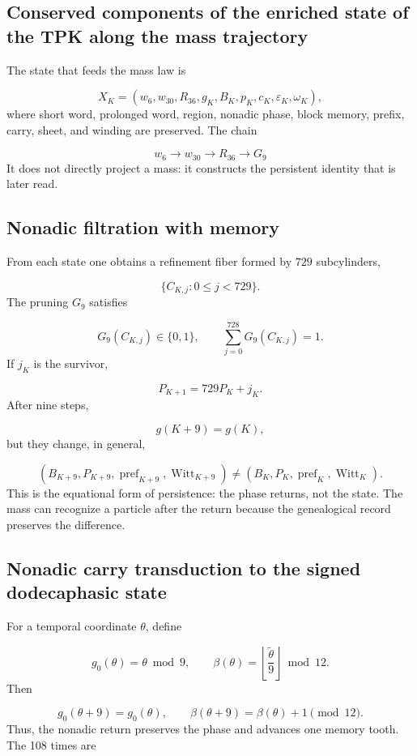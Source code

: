 \subsection{Conserved components of the enriched state of the TPK along the mass trajectory}
The state that feeds the mass law is

\[
 X_K=(w_6,w_{30},R_{36},g_K,B_K,p_K,c_K,\varepsilon_K,\omega_K),
\]
where short word, prolonged word, region, nonadic phase, block memory, prefix, carry, sheet, and winding are preserved. The chain

\[
 w_6\longrightarrow w_{30}\longrightarrow R_{36}
 \longrightarrow G_9
\]
It does not directly project a mass: it constructs the persistent identity that is later read.

\subsection{Nonadic filtration with memory}
From each state one obtains a refinement fiber formed by \(729\) subcylinders,

\[
 \{C_{K,j}:0\le j<729\}.
\]
The pruning \(G_9\) satisfies

\[
 G_9(C_{K,j})\in\{0,1\},\qquad
 \sum_{j=0}^{728}G_9(C_{K,j})=1.
\]
If \(j_K\) is the survivor,

\[
 P_{K+1}=729P_K+j_K.
\]
After nine steps,

\[
 g(K+9)=g(K),
\]
but they change, in general,

\[
 (B_{K+9},P_{K+9},\operatorname{pref}_{K+9},
 \operatorname{Witt}_{K+9})
 \ne
 (B_K,P_K,\operatorname{pref}_K,\operatorname{Witt}_K).
\]
This is the equational form of persistence: the phase returns, not the state. The mass can recognize a particle after the return because the genealogical record preserves the difference.

\subsection{Nonadic carry transduction to the signed dodecaphasic state}
For a temporal coordinate \(\theta\), define

\[
 g_0(\theta)=\theta\bmod9,\qquad
 \beta(\theta)=
 \left\lfloor\frac{\widetilde\theta}{9}\right\rfloor\bmod12.
\]
Then

\[
 g_0(\theta+9)=g_0(\theta),\qquad
 \beta(\theta+9)=\beta(\theta)+1\pmod{12}.
\]
Thus, the nonadic return preserves the phase and advances one memory tooth. The 108 times are

